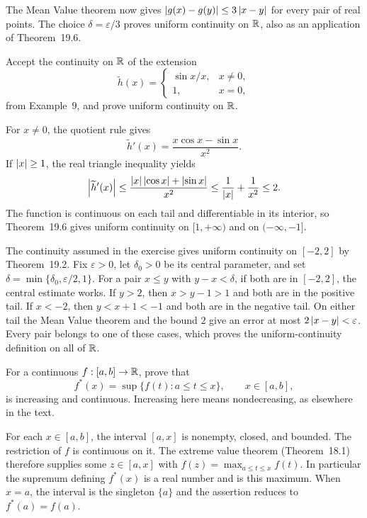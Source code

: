 The Mean Value theorem now gives
$\left|g(x)-g(y)\right|\le3\left|x-y\right|$ for every pair of real
points. The choice $\delta=\varepsilon/3$ proves uniform
continuity on $\mathbb{R}$, also as an application of Theorem~19.6.

\goal Accept the continuity on $\mathbb{R}$ of the extension
\[
 \widetilde h(x)=
 \begin{cases}
  \sin x/x,&x\ne0,\\
  1,&x=0,
 \end{cases}
\]
from Example~9, and prove uniform continuity on $\mathbb{R}$.

For $x\ne0$, the quotient rule gives
\[
 \widetilde h'(x)=\frac{x\cos x-\sin x}{x^2}.
\]
If $\left|x\right|\ge1$, the real triangle inequality yields
\[
 \left|\widetilde h'(x)\right|
 \le\frac{\left|x\right|\left|\cos x\right|+\left|\sin x\right|}{x^2}
 \le\frac1{\left|x\right|}+\frac1{x^2}\le2.
\]
The function is continuous on each tail and differentiable in
its interior, so Theorem~19.6 gives uniform continuity on
$[1,+\infty)$ and on $(-\infty,-1]$.

The continuity assumed in the exercise gives uniform continuity
on $[-2,2]$ by Theorem~19.2. Fix $\varepsilon>0$, let
$\delta_0>0$ be its central parameter, and set
$\delta=\min\{\delta_0,\varepsilon/2,1\}$.
For a pair $x\le y$ with $y-x<\delta$, if both are in
$[-2,2]$, the central estimate works. If $y>2$, then
$x>y-1>1$ and both are in the positive tail. If $x<-2$,
then $y<x+1<-1$ and both are in the negative tail.
On either tail the Mean Value theorem and the bound $2$
give an error at most $2\left|x-y\right|<\varepsilon$.
Every pair belongs to one of these cases, which proves the
uniform-continuity definition on all of $\mathbb{R}$.

\goal For a continuous $f:[a,b]\to\mathbb{R}$, prove that
\[
 f^*(x)=\sup\{f(t):a\le t\le x\},\qquad x\in[a,b],
\]
is increasing and continuous. Increasing here means nondecreasing,
as elsewhere in the text.

For each $x\in[a,b]$, the interval $[a,x]$ is nonempty,
closed, and bounded. The restriction of $f$ is continuous on it.
The extreme value theorem (Theorem~18.1) therefore supplies
some $z\in[a,x]$ with $f(z)=\max_{a\le t\le x}f(t)$.
In particular the supremum defining $f^*(x)$ is a real number
and is this maximum. When $x=a$, the interval is the singleton
$\{a\}$ and the assertion reduces to $f^*(a)=f(a)$.

